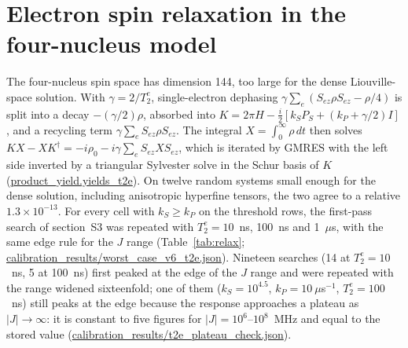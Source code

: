 \documentclass[11pt]{article}
\begin{document}
\begin{table}[h]
\caption{$F(k_S,k_P)$ (\%) in the anisotropic model from the full search.
Rates in $\mu$s$^{-1}$.}
\label{tab:aniso}
\centering
\resizebox{\textwidth}{!}{}
\end{table}

\begin{table}[h]
\caption{Searched $F$ (\%) at the threshold-setting cells in the reference and
richer models, and in the reduced pair with and without electron dephasing.}
\label{tab:sens}
\centering

\end{table}

\section{Electron spin relaxation in the four-nucleus model}
The four-nucleus spin space has dimension 144, too large for the dense
Liouville-space solution. With $\gamma = 2/T_2^e$, single-electron dephasing
$\gamma\sum_e(S_{ez}\rho S_{ez}-\rho/4)$ is split into a decay $-(\gamma/2)\rho$,
absorbed into $K = 2\pi H - \tfrac i2[k_SP_S + (k_P+\gamma/2)I]$, and a recycling
term $\gamma\sum_eS_{ez}\rho S_{ez}$. The integral $X=\int_0^\infty\rho\,dt$ then
solves $KX - XK^\dagger = -i\rho_0 - i\gamma\sum_eS_{ez}XS_{ez}$, which is iterated
by GMRES\cite{Saad1986} with the left side inverted by a triangular Sylvester solve in the Schur
basis of $K$ (\url{product_yield.yields_t2e}). On twelve random systems small
enough for the dense solution, including anisotropic hyperfine tensors, the two
agree to a relative $1.3\times10^{-13}$. For every cell with $k_S\ge k_P$ on the
threshold rows, the first-pass search of section~S3 was repeated with
$T_2^e = 10$~ns, 100~ns and 1~$\mu$s, with the same edge rule for the $J$ range
(Table~\ref{tab:relax}; \url{calibration_results/worst_case_v6_t2e.json}).
Nineteen searches (14 at $T_2^e = 10$~ns, 5 at 100~ns) first peaked at the edge
of the $J$ range and were repeated with the range widened sixteenfold; one of them
($k_S = 10^{4.5}$, $k_P = 10~\mu$s$^{-1}$, $T_2^e = 100$~ns) still peaks at the
edge because the response approaches a plateau as $|J|\to\infty$: it is
constant to five figures for $|J| = 10^6$--$10^8$~MHz and equal to the stored
value (\url{calibration_results/t2e_plateau_check.json}).

\begin{table}[h]
\caption{Searched $F$ (\%) without and with single-electron dephasing in the
four-nucleus model. Rates in $\mu$s$^{-1}$.}
\label{tab:relax}
\centering

\end{table}
\end{document}

